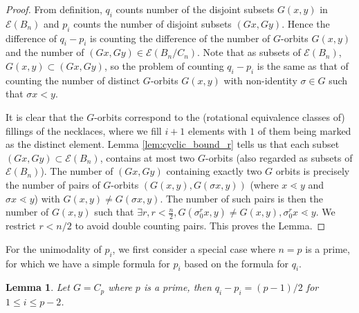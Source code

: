\documentclass[10 pt]{amsart}
\theoremstyle{plain}
\newtheorem{lem}[thm]{Lemma}
\theoremstyle{definition}
\theoremstyle{remark}
\numberwithin{equation}{section}
\begin{document}
\begin{proof}
From definition, $q_i$ counts  number of the disjoint subsets $G(x, y)$ in $ \mathcal E (B_n)$ and $p_i$ counts the number of disjoint subsets $(Gx, Gy)$. Hence the difference of $q_i - p_i$ is counting the difference of the number of $G$-orbits $G (x ,y)$ and the number of $(Gx,Gy) \in  \mathcal E(B_n/C_n)$.  Note that as subsets of $ \mathcal E (B_n)$, $G(x, y) \subset (Gx, Gy)$, so the problem of counting $q_i - p_i$ is the same as that of counting the number of distinct $G$-orbits $G(x , y)$  with non-identity $\sigma \in G$ such that $\sigma x < y$. 


It is clear that the $G$-orbits correspond to the (rotational equivalence classes of) fillings of the necklaces, where we fill $i+1$ elements with $1$ of them being marked as the distinct element. Lemma \ref{lem:cyclic_bound_r} tells us that each subset $(Gx, Gy) \subset  \mathcal E (B_n)$, contains at most two $G$-orbits (also regarded as subsets of $ \mathcal E (B_n)$). The number of $(Gx, Gy)$ containing exactly two $G$ orbits is precisely the number of pairs of $G$-orbits $(G (x, y),G(\sigma x, y ))$ (where $ x \lessdot y$ and $\sigma x \lessdot y$) with $G(x, y) \neq G(\sigma x, y).$ The number of such pairs is then the number of $G(x, y)$ such that $ \exists r,r<\frac n 2, G(\sigma_0^r x, y)\neq G(x, y),\sigma_0^r x \lessdot y.$ We restrict $r < n/2$ to avoid double counting pairs. This proves the Lemma.
\end{proof}

For the unimodality of $p_i$, we first consider a special case where $n = p$ is a prime, for which we have a simple formula for $p_i$ based on the formula for $q_i$.

\begin{lem}{\label{lem:cyclicprime}}
Let $G = C_p$ where $p$ is a prime, then $q_i - p_i = (p-1)/2$ for $ 1 \le i \le p-2$. 
\end{lem}
\end{document}
